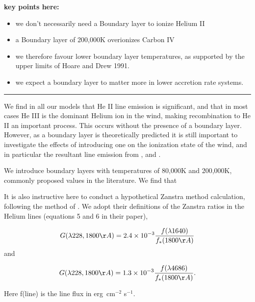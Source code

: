 \documentclass[preprint, a4paper, 11pt]{aastex}
\begin{document}
{\bf 
\noindent key points here:

\begin{itemize}
	\item we don't necessarily need a Boundary layer to ionize Helium II
	\item a Boundary layer of 200,000K overionizes Carbon IV
	\item we therefore favour lower boundary layer temperatures, as supported
	by the upper limits of Hoare and Drew 1991.
	\item we expect a boundary layer to matter more in lower accretion
	rate systems.
\end{itemize}
}

\noindent\rule{16cm}{0.4pt}

We find in all our models that He II line emission is significant, and that 
in most cases He  III is the dominant Helium ion in the wind, making recombination
to He II an important process. This occurs without the presence of a boundary 
layer. However, as a boundary layer is theoretically predicted 
it is still important to investigate the effects of introducing
one on the ionization state of the wind, and in particular
the resultant line emission from \heiiuv, \heiiuv and \civ. 

We introduce boundary layers with temperatures of 80,000K and 200,000K,
commonly proposed values in the literature. We find that 




It is also instructive here to conduct a hypothetical 
Zanstra method calculation, following the method of \cite{hoare1991}. 
We adopt their definitions of the Zanstra ratios in the Helium lines (equations 5 and 6 
in their paper),


\begin{equation}
G (\lambda228, 1800 \AA) = 2.4\times 10^{-3} \frac{f(\lambda1640)}{f_*(1800\AA)}
\end{equation}
and

\begin{equation}
G (\lambda228, 1800 \AA) = 1.3\times 10^{-3} \frac{f(\lambda4686)}{f_*(1800\AA)}.\\
\end{equation}

Here f(line) is the line flux in erg~cm$^{-2}$ s$^{-1}$. 




\end{document}
